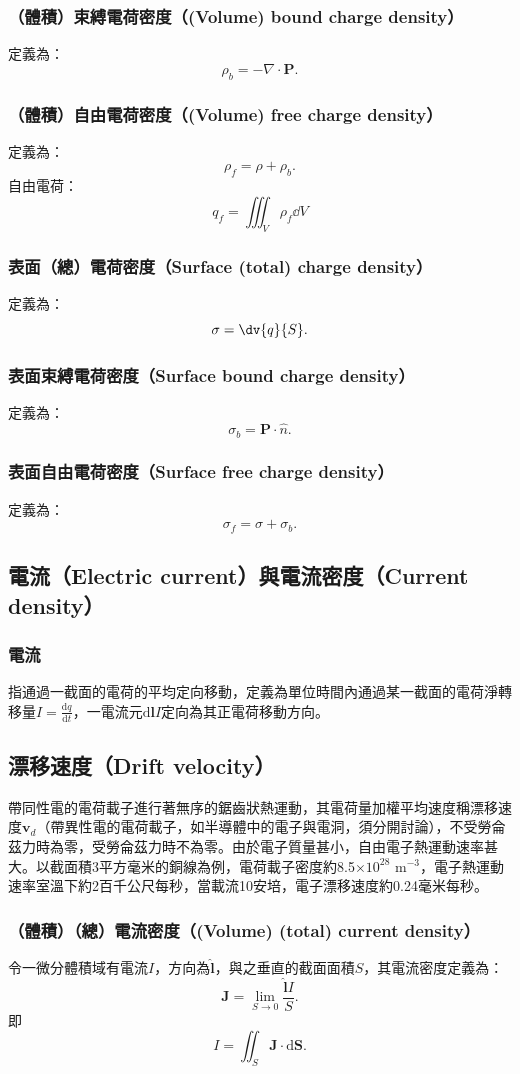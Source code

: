 \documentclass[a4paper,12pt]{report}
\begin{document}
\begin{itemize}
\subsubsection{（體積）束縛電荷密度（(Volume) bound charge density）}
定義為：
\[\rho_b = -\nabla \cdot \mathbf{P}.\]
\subsubsection{（體積）自由電荷密度（(Volume) free charge density）}
定義為：
\[\rho_f = \rho + \rho_b.\]
自由電荷：
\[q_f=\iiint_V\rho_f\dd{V}\]
\subsubsection{表面（總）電荷密度（Surface (total) charge density）}
定義為：
\[\sigma = \dv{q}{S}.\]
\subsubsection{表面束縛電荷密度（Surface bound charge density）}
定義為：
\[\sigma_b = \mathbf{P}\cdot\hat{n}.\]
\subsubsection{表面自由電荷密度（Surface free charge density）}
定義為：
\[\sigma_f = \sigma + \sigma_b.\]
\subsection{電流（Electric current）與電流密度（Current density）}
\subsubsection{電流}
指通過一截面的電荷的平均定向移動，定義為單位時間內通過某一截面的電荷淨轉移量$I=\frac{\mathrm{d}q}{\mathrm{d}t}$，一電流元$\mathrm{d}\mathbf{l}I$定向為其正電荷移動方向。
\subsection{漂移速度（Drift velocity）}
帶同性電的電荷載子進行著無序的鋸齒狀熱運動，其電荷量加權平均速度稱漂移速度$\mathbf{v}_d$（帶異性電的電荷載子，如半導體中的電子與電洞，須分開討論），不受勞侖茲力時為零，受勞侖茲力時不為零。由於電子質量甚小，自由電子熱運動速率甚大。以截面積3平方毫米的銅線為例，電荷載子密度約8.5$\times 10^{28}$ m$^{-3}$，電子熱運動速率室溫下約2百千公尺每秒，當載流10安培，電子漂移速度約0.24毫米每秒。
\subsubsection{（體積）（總）電流密度（(Volume) (total) current density）}
令一微分體積域有電流$I$，方向為$\hat{\mathbf{l}} $，與之垂直的截面面積$S$，其電流密度定義為：
\[\mathbf{J} = \lim_{S\to 0}\frac{\hat{\mathbf{l}} I}{S}.\]
即
\[I=\iint _{S}\mathbf {J} \cdot \mathrm{d}\mathbf{S}.\]

\end{itemize}
\end{document}
